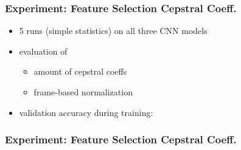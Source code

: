 \begin{frame}
  \frametitle{Experiment: Feature Selection Cepstral Coeff.}
  \begin{itemize}
    \item 5 runs (simple statistics) on all three CNN models
    \item evaluation of
    \begin{itemize}
     \item amount of cepstral coeffs
     \item frame-based normalization
    \end{itemize}
    \item validation accuracy during training:
  \end{itemize}
  \vspace{-0.5cm}
  \begin{figure}[!ht]
    \centering
  \end{figure}
\end{frame}

\begin{frame}
  \frametitle{Experiment: Feature Selection Cepstral Coeff.}
  \begin{figure}[!ht]
    \centering
  \end{figure}
\end{frame}


